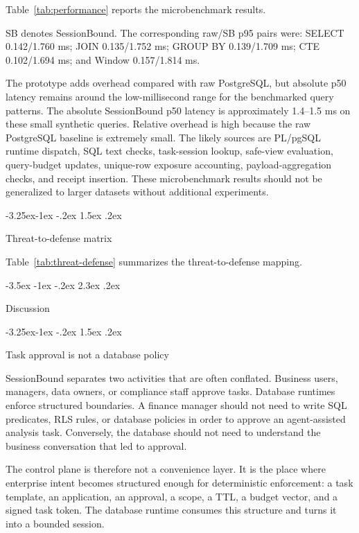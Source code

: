 \documentclass[10pt,twocolumn]{article}
\makeatletter
\renewcommand\section{\@startsection{section}{1}{\z@}%
  {-3.5ex \@plus -1ex \@minus -.2ex}%
  {2.3ex \@plus .2ex}%
  {\normalfont\Large\bfseries\raggedright}}
\renewcommand\subsection{\@startsection{subsection}{2}{\z@}%
  {-3.25ex\@plus -1ex \@minus -.2ex}%
  {1.5ex \@plus .2ex}%
  {\normalfont\large\bfseries\raggedright}}
\makeatother
\begin{document}
Table~\ref{tab:performance} reports the microbenchmark results.

SB denotes SessionBound. The corresponding raw/SB p95 pairs were: SELECT
0.142/1.760 ms; JOIN 0.135/1.752 ms; GROUP BY 0.139/1.709 ms; CTE
0.102/1.694 ms; and Window 0.157/1.814 ms.

The prototype adds overhead compared with raw PostgreSQL, but absolute
p50 latency remains around the low-millisecond range for the benchmarked
query patterns. The absolute SessionBound p50 latency is approximately
1.4--1.5 ms on these small synthetic queries. Relative overhead is high
because the raw PostgreSQL baseline is extremely small. The likely
sources are PL/pgSQL runtime dispatch, SQL text checks, task-session
lookup, safe-view evaluation, query-budget updates, unique-row exposure
accounting, payload-aggregation checks, and receipt insertion. These
microbenchmark results should not be generalized to larger datasets
without additional experiments.

\hypertarget{threat-to-defense-matrix}{%
\subsection{Threat-to-defense
matrix}\label{threat-to-defense-matrix}}

Table~\ref{tab:threat-defense} summarizes the threat-to-defense
mapping.


\hypertarget{discussion}{%
\section{Discussion}\label{discussion}}

\hypertarget{task-approval-is-not-a-database-policy}{%
\subsection{Task approval is not a database
policy}\label{task-approval-is-not-a-database-policy}}

SessionBound separates two activities that are often conflated.
Business users, managers, data owners, or compliance staff approve
tasks. Database runtimes enforce structured boundaries. A finance
manager should not need to write SQL predicates, RLS rules, or database
policies in order to approve an agent-assisted analysis task.
Conversely, the database should not need to understand the business
conversation that led to approval.

The control plane is therefore not a convenience layer. It is the place
where enterprise intent becomes structured enough for deterministic
enforcement: a task template, an application, an approval, a scope, a
TTL, a budget vector, and a signed task token. The database runtime
consumes this structure and turns it into a bounded session.
\end{document}
